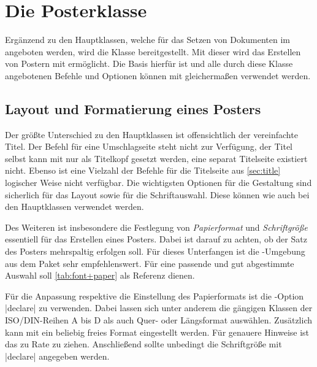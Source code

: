 \chapter[Die Klasse tudscrposter]{Die Posterklasse}
%
%
\begin{Bundle*}[v2.05]{}
%
\printchangedatlist%
%
Ergänzend zu den Hauptklassen, welche für das Setzen von Dokumenten im \TUDCD 
angeboten werden, wird die Klasse  bereitgestellt. Mit 
dieser wird das Erstellen von Postern mit  ermöglicht. Die Basis 
hierfür ist  und alle durch diese Klasse angebotenen Befehle 
und Optionen können mit  gleichermaßen verwendet werden. 

\section{Layout und Formatierung eines Posters}
%
%
%
Der größte Unterschied zu den Hauptklassen ist offensichtlich der vereinfachte 
Titel. Der Befehl  für eine Umschlagseite steht nicht zur 
Verfügung, der Titel selbst kann mit  nur als Titelkopf 
gesetzt werden, eine separat Titelseite existiert nicht. Ebenso ist eine 
Vielzahl der Befehle für die Titelseite aus \autoref{sec:title} logischer Weise 
nicht verfügbar. Die wichtigsten Optionen für die Gestaltung sind sicherlich 
 für das Layout sowie  für die Schriftauswahl. Diese 
können wie auch bei den Hauptklassen verwendet werden. 

Des Weiteren ist insbesondere die Festlegung von \emph{Papierformat} und 
\emph{Schriftgröße} essentiell für das Erstellen eines Posters. 
Dabei ist darauf zu achten, ob der Satz des Posters mehrspaltig erfolgen soll. 
Für dieses Unterfangen ist die -Umgebung aus dem Paket 
 sehr empfehlenswert. Für eine passende und gut abgestimmte 
Auswahl soll \autoref{tab:font+paper} als Referenz dienen.

Für die Anpassung respektive die Einstellung des Papierformats ist die 
\KOMAScript-Option |declare| zu verwenden. Dabei 
lassen sich unter anderem die gängigen Klassen der ISO/DIN-Reihen A bis D als 
auch Quer- oder Längsformat auswählen. Zusätzlich kann mit  
ein beliebig freies Format eingestellt werden. Für genauere Hinweise ist das 
\scrguide zu Rate zu ziehen. Anschließend sollte unbedingt die Schriftgröße 
mit |declare| angegeben werden. 


\end{Bundle*}
